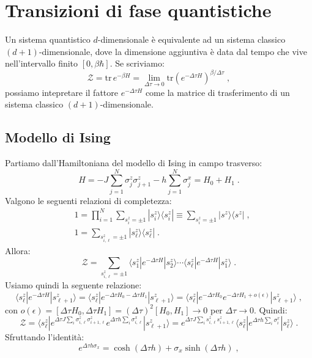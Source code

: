 \documentclass[10pt,a4paper]{report}
\theoremstyle{definition}
\numberwithin{equation}{section}
\newcommand{\bra}{\langle}
\newcommand{\ket}{\rangle}
\newcommand{\tr}{\mathrm{tr}}
\newcommand{\zpart}{\mathcal{Z}}
\begin{document}
\chapter{Transizioni di fase quantistiche}
Un sistema quantistico $d$-dimensionale è equivalente ad un sistema classico $(d+1)$-dimensionale, dove la dimensione aggiuntiva è data dal tempo che vive nell'intervallo finito $[0,\beta\hbar]$. Se scriviamo:
$$
\zpart=\tr\, e^{-\beta H}=\lim_{\Delta\tau\to 0}\tr(e^{-\Delta\tau H})^{\beta/\Delta\tau}\;,
$$
possiamo intepretare il fattore $e^{-\Delta \tau H}$ come la matrice di trasferimento di un sistema classico $(d+1)$-dimensionale.
\section{Modello di Ising}
 Partiamo dall'Hamiltoniana del modello di Ising in campo trasverso:
\begin{equation}
\boxed{H=-J\sum_{j=1}^N\sigma_j^z\sigma_{j+1}^z-h\sum_{j=1}^N\sigma_j^x}=H_0+H_1\;.
\end{equation}
Valgono le seguenti relazioni di completezza:
\begin{align}
&1=\prod_{i=1}^N\sum_{s_i^z=\pm 1}|s_i^z\ket\bra s_i^z|\equiv\sum_{s_i^z=\pm 1}|s^z\ket\bra s^z|\;, \\
&1=\sum_{s_{i,\ell}^z=\pm 1}|s_{\ell}^z\ket\bra s_{\ell}^z|\;.
\end{align}
Allora:
\begin{equation}
\zpart=\sum_{s_{i,\ell}^z=\pm 1}\bra s_1^z|e^{-\Delta\tau H}|s_2^z\ket\cdots \bra s_{\ell}^z|e^{-\Delta\tau H}|s_1^z\ket\;.
\end{equation}
Usiamo quindi la seguente relazione:
\begin{equation}
\bra s_{\ell}^z|e^{-\Delta\tau H}|s_{\ell+1}^z\ket=\bra s_{\ell}^z|e^{-\Delta\tau H_0-\Delta\tau H_1}|s_{\ell+1}^z\ket=\bra s_{\ell}^z|e^{-\Delta\tau H_0}e^{-\Delta\tau H_1+o(\epsilon)}|s_{\ell+1}^z\ket\;,
\end{equation}
con $o(\epsilon)=[\Delta\tau H_0,\Delta\tau H_1]=(\Delta\tau)^2[H_0,H_1]\to 0$ per $\Delta\tau\to 0$. Quindi:
$$
\zpart =\bra s_{\ell}^z|e^{\Delta\tau J\sum_i\sigma_{i,\ell}^z\sigma_{i+1,\ell}^z}e^{\Delta\tau h\sum_i\sigma_{i,\ell}^x}|s_{\ell+1}^z\ket =e^{\Delta\tau J\sum_i s_{i,\ell}^z s_{i+1,\ell}^z}\bra s_{\ell}^z|e^{\Delta\tau h\sum_i\sigma_i^x}|s_{\ell}^z\ket\;.
$$
Sfruttando l'identità:
\begin{equation}
e^{\Delta\tau h\sigma_x}=\cosh(\Delta\tau h)+\sigma_x\sinh(\Delta\tau h)\;,
\end{equation}
\end{document}
